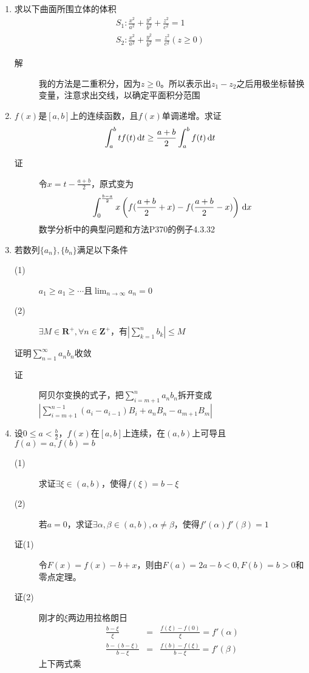 \begin{enumerate}
\item 求以下曲面所围立体的体积
\[
\begin{array}{l}
S_1:\frac{x^2}{a^2}+\frac{y^2}{b^2}+\frac{z^2}{c^2} =1\\
S_2:\frac{x^2}{a^2}+\frac{y^2}{b^2} = \frac{z^2}{c^2}(z\geq 0)
\end{array}
\]
\begin{description}
\item[解] 我的方法是二重积分，因为$z\geq 0$。所以表示出$z_1-z_2$之后用极坐标替换变量，注意求出交线，以确定平面积分范围
\end{description}

\item $f(x)$是$[a,b]$上的连续函数，且$f(x)$单调递增。求证
\[
\int_a^b tf(t)\,\mathrm{d} t \geq \frac{a+b}{2}\int_a^b f(t)\,\mathrm{d} t
\]
\begin{description}
\item[证] 令$x=t-\frac{a+b}{2}$，原式变为
\[
\int_0^{\frac{b-a}{2}} x\left(f(\frac{a+b}{2}+x)-f(\frac{a+b}{2}-x)\right) \,\mathrm{d} x
\]
数学分析中的典型问题和方法P370的例子4.3.32
\end{description}

\item 若数列$\{a_n\},\{b_n\}$满足以下条件
\begin{description}
\item[(1)] $a_1 \geq a_1 \geq \cdots$且$\lim_{n \to \infty}a_n = 0$
\item[(2)] $\exists M \in \mathbf{R^+},\forall n \in \mathbf{Z^+}$，有$|\sum_{k=1}^n b_k|\leq M$
\end{description}
证明$\sum_{n=1}^\infty a_nb_n$收敛
\begin{description}
\item[证] 阿贝尔变换的式子，把$\sum_{i=m+1}^n a_nb_n$拆开变成$|\sum_{i=m+1}^{n-1}(a_i-a_{i-1})B_i+a_nB_n-a_{m+1}B_m|$
\end{description}

\item 设$0\leq a < \frac{b}{2}$，$f(x)$在$[a,b]$上连续，在$(a,b)$上可导且$f(a)=a,f(b)=b$
\begin{description}
\item[(1)] 求证$\exists \xi \in (a,b)$，使得$f(\xi) = b -\xi$
\item[(2)] 若$a=0$，求证$\exists \alpha,\beta \in (a,b),\alpha\neq\beta$，使得$f'(\alpha)f'(\beta)=1$
\item[证(1)] 令$F(x)=f(x)-b+x$，则由$F(a)=2a-b<0,F(b)=b>0$和零点定理。
\item[证(2)] 刚才的$\xi$两边用拉格朗日
\begin{eqnarray*}
\frac{b-\xi}{\xi} &=& \frac{f(\xi)-f(0)}{\xi}=f'(\alpha)\\
\frac{b-(b-\xi)}{b-\xi} &=& \frac{f(b)-f(\xi)}{b-\xi}=f'(\beta)
\end{eqnarray*}
上下两式乘
\end{description}


\end{enumerate}
